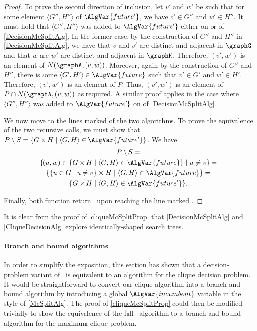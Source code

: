 \begin{proof}
    To prove the second direction of inclusion, let $v'$ and $w'$ be such that for
    some element $\langle G'',H'' \rangle$ of $\AlgVar{future'}$, we have
    $v' \in G''$ and $w' \in H''$.  It must hold that 
    $\langle G'',H'' \rangle$ was added to $\AlgVar{future'}$ either on
     or  of
    \cref{DecisionMcSplitAlg}. In the former case, by the construction of $G''$ and $H''$
    in \cref{DecisionMcSplitAlg}, we have that $v$ and $v'$ are distinct and adjacent
    in $\graphG$ and that $w$ are $w'$ are distinct and adjacent in $\graphH$.
    Therefore, $(v',w')$ is an element
    of $N(\graphA, (v,w))$.
    Moreover, again by the construction of $G''$ and $H''$,
    there is some $\langle G',H' \rangle \in \AlgVar{future}$ such that
    $v' \in G'$ and $w' \in H'$.
    Therefore, $(v',w')$ is an element of $P$.
    Thus, $(v',w')$ is an element of $P \cap N(\graphA, (v,w))$ as required.
    A similar proof applies in the case where
    $\langle G'',H'' \rangle$ was added to $\AlgVar{future'}$ on
     of \cref{DecisionMcSplitAlg}.

    We now move to the lines marked  of the two algorithms. 
    To prove the equivalence of the two recursive calls, we must show that
    $P \setminus S = \{G \times H \mid \langle G,H \rangle \in \AlgVar{future'}\}$. We have
\begin{gather}
    P \setminus S = \\
    \{(u,w) \in \{G \times H \mid \langle G,H \rangle \in \AlgVar{future}\} \mid u \not= v\} = \\
    \{\{u \in G \mid u \not= v\} \times H \mid \langle G,H \rangle \in \AlgVar{future}\} = \\
    \{G \times H \mid \langle G,H \rangle \in \AlgVar{future'}\}.
\end{gather}

    Finally, both function return \boolF\ upon reaching the line marked .
\end{proof}

It is clear from the proof of \cref{cliqueMcSplitProp} that \cref{DecisionMcSplitAlg}
and \cref{CliqueDecisionAlg} explore identically-shaped search trees.

\paragraph{Branch and bound algorithms}
In order to simplify the exposition, this section has shown that a
decision-problem variant of \McSplit\ is equivalent to an algorithm
for the clique decision problem.  It would be straightforward to convert our clique
algorithm into a branch and bound algorithm by introducing a global $\AlgVar{incumbent}$
variable in the style of \cref{McSplitAlg}.  The proof of \cref{cliqueMcSplitProp} could
then be modified trivially to show the equivalence of the full \McSplit\ algorithm to
a branch-and-bound algorithm for the maximum clique problem.


